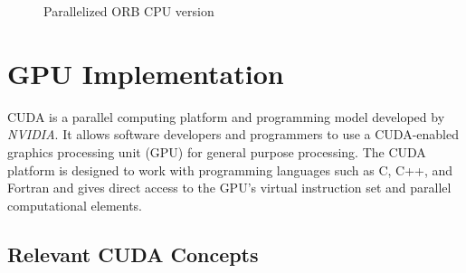 \documentclass[]{article}
\begin{document}
\begin{figure}[H]
	\begin{center}
	\end{center}
	\caption{Parallelized ORB CPU version}
	\label{fig:orbp}
\end{figure}

\newpage
\section{GPU Implementation}\label{sec:gpuimpl}

CUDA is a parallel computing platform and programming model developed by \textit{NVIDIA}. \cite{CUDAGuide} It allows software developers and programmers to use a CUDA-enabled graphics processing unit (GPU) for general purpose processing.
The CUDA platform is designed to work with programming languages such as C, C++, and Fortran and gives direct access to the GPU's virtual instruction set and parallel computational elements.

\subsection{Relevant CUDA Concepts}
\end{document}
